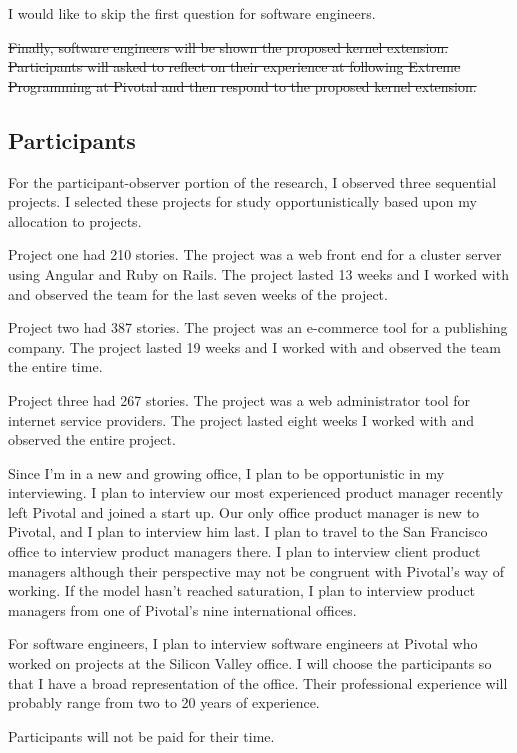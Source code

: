 \documentclass[preprint,12pt,3p]{elsarticle}
\begin{document}
I would like to skip the first question for software engineers.

\sout{Finally, software engineers will be shown the proposed kernel extension. Participants will asked to reflect on their experience at following Extreme Programming at Pivotal and then respond to the proposed kernel extension.}

\subsection{Participants}
For the participant-observer portion of the research, I %
observed three sequential projects.  I selected these projects for study opportunistically based upon my allocation to projects.

Project one had 210 stories. The project was a web front end for a cluster server using Angular and Ruby on Rails. The project lasted 13 weeks and I worked with and observed the team for the last seven weeks of the project. 

Project two had 387 stories. The project was an e-commerce tool for a publishing company. The project lasted 19 weeks and I worked with and observed the team the entire time.

Project three had 267 stories. The project was a web administrator tool for internet service providers. The project lasted eight weeks I worked with and observed the entire project.

Since I'm in a new and growing office, I plan to be opportunistic in my interviewing. I plan to interview our most experienced product manager recently left Pivotal and joined a start up. Our only office product manager is new to Pivotal, and I plan to interview him last. I plan to travel to the San Francisco office to interview product managers there. I plan to interview client product managers although their perspective may not be congruent with Pivotal's way of working. If the model hasn't reached saturation, I plan to interview product managers from one of Pivotal's nine international offices.

For software engineers, I plan to interview software engineers at Pivotal who worked on projects at the Silicon Valley office. I will choose the participants so that I have a broad representation of the office. Their professional experience will probably range from two to 20 years of experience. 

Participants will not be paid for their time. 
\end{document}
